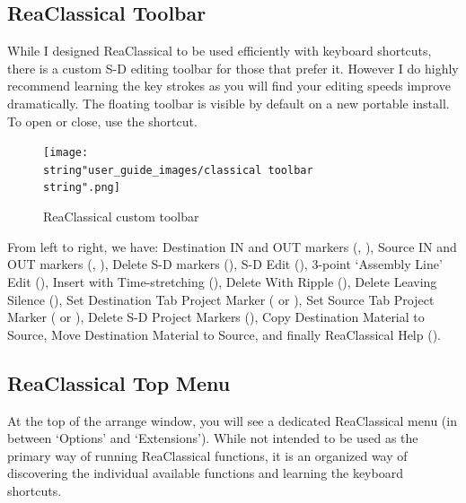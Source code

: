 \documentclass[10pt,american]{article}
\begin{document}
\subsection{ReaClassical Toolbar}

While I designed ReaClassical to be used efficiently with keyboard shortcuts,
there is a custom S-D editing toolbar for those that prefer it. However I do
highly recommend learning the key strokes as you will find your editing speeds
improve dramatically. The floating toolbar is visible by default on a new
portable install. To open or close, use the  shortcut.
\begin{flushleft}
\begin{figure}[H]
\begin{centering}
\texttt{[image: \\string"user\_guide\_images/classical toolbar\\string".png]}
\par\end{centering} \caption{\label{classical-toolbar-1}ReaClassical custom
toolbar}
\end{figure}
\par\end{flushleft}

From left to right, we have: Destination IN and OUT markers (,
), Source IN and OUT markers (, ), Delete S-D markers
(\keys{\ctrl+\del}), S-D Edit (), 3-point `Assembly Line' Edit
(), Insert with Time-stretching (), Delete With Ripple
(\keys{\backspace}), Delete Leaving Silence (\keys{\ctrl+\backspace}), Set
Destination Tab Project Marker ( or ), Set
Source Tab Project Marker ( or ), Delete S-D
Project Markers (), Copy Destination Material to Source, Move
Destination Material to Source, and finally ReaClassical Help ().

\subsection{ReaClassical Top Menu}

At the top of the arrange window, you will see a dedicated ReaClassical menu (in
between `Options' and `Extensions'). While not intended to be used as the
primary way of running ReaClassical functions, it is an organized way of
discovering the individual available functions and learning the keyboard
shortcuts.
\end{document}
